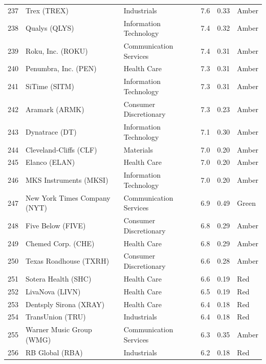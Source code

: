 \documentclass[11pt,a4paper]{article}
\begin{document}
{\begin{longtable}{r p{4.6cm} p{3cm} r r l}
237 & Trex (TREX) & Industrials & 7.6 & 0.33 & \cellcolor[HTML]{FFEB9C}Amber \\
238 & Qualys (QLYS) & Information Technology & 7.4 & 0.32 & \cellcolor[HTML]{FFEB9C}Amber \\
239 & Roku, Inc. (ROKU) & Communication Services & 7.4 & 0.31 & \cellcolor[HTML]{FFEB9C}Amber \\
240 & Penumbra, Inc. (PEN) & Health Care & 7.3 & 0.31 & \cellcolor[HTML]{FFEB9C}Amber \\
241 & SiTime (SITM) & Information Technology & 7.3 & 0.31 & \cellcolor[HTML]{FFEB9C}Amber \\
242 & Aramark (ARMK) & Consumer Discretionary & 7.3 & 0.23 & \cellcolor[HTML]{FFEB9C}Amber \\
243 & Dynatrace (DT) & Information Technology & 7.1 & 0.30 & \cellcolor[HTML]{FFEB9C}Amber \\
244 & Cleveland-Cliffs (CLF) & Materials & 7.0 & 0.20 & \cellcolor[HTML]{FFEB9C}Amber \\
245 & Elanco (ELAN) & Health Care & 7.0 & 0.20 & \cellcolor[HTML]{FFEB9C}Amber \\
246 & MKS Instruments (MKSI) & Information Technology & 7.0 & 0.20 & \cellcolor[HTML]{FFEB9C}Amber \\
247 & New York Times Company (NYT) & Communication Services & 6.9 & 0.49 & \cellcolor[HTML]{C6EFCE}Green \\
248 & Five Below (FIVE) & Consumer Discretionary & 6.8 & 0.29 & \cellcolor[HTML]{FFEB9C}Amber \\
249 & Chemed Corp. (CHE) & Health Care & 6.8 & 0.29 & \cellcolor[HTML]{FFEB9C}Amber \\
250 & Texas Roadhouse (TXRH) & Consumer Discretionary & 6.6 & 0.28 & \cellcolor[HTML]{FFEB9C}Amber \\
251 & Sotera Health (SHC) & Health Care & 6.6 & 0.19 & \cellcolor[HTML]{F4B6B6}Red \\
252 & LivaNova (LIVN) & Health Care & 6.5 & 0.19 & \cellcolor[HTML]{F4B6B6}Red \\
253 & Dentsply Sirona (XRAY) & Health Care & 6.4 & 0.18 & \cellcolor[HTML]{F4B6B6}Red \\
254 & TransUnion (TRU) & Industrials & 6.4 & 0.18 & \cellcolor[HTML]{F4B6B6}Red \\
255 & Warner Music Group (WMG) & Communication Services & 6.3 & 0.35 & \cellcolor[HTML]{FFEB9C}Amber \\
256 & RB Global (RBA) & Industrials & 6.2 & 0.18 & \cellcolor[HTML]{F4B6B6}Red \\

\end{longtable}}
\end{document}
